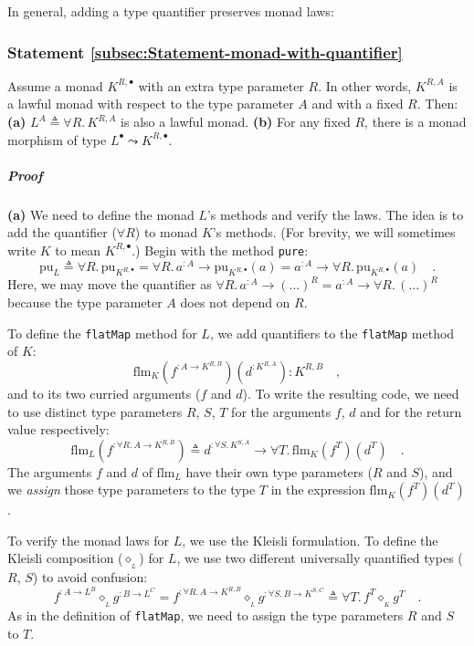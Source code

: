 In general, adding a type quantifier preserves monad laws:

\subsubsection{Statement \label{subsec:Statement-monad-with-quantifier}\ref{subsec:Statement-monad-with-quantifier}}

Assume a monad $K^{R,\bullet}$ with an extra type parameter $R$.
In other words, $K^{R,A}$ is a lawful monad with respect to the type
parameter $A$ and with a fixed $R$. Then: \textbf{(a)} $L^{A}\triangleq\forall R.\,K^{R,A}$
is also a lawful monad. \textbf{(b)} For any fixed $R$, there is
a monad morphism of type $L^{\bullet}\leadsto K^{R,\bullet}$.

\subparagraph{Proof}

\textbf{(a)} We need to define the monad $L$\textsf{'}s methods and verify
the laws. The idea is to add the quantifier ($\forall R$) to monad
$K$\textsf{'}s methods. (For brevity, we will sometimes write $K$ to mean
$K^{R,\bullet}$.) Begin with the method \lstinline!pure!:
\[
\text{pu}_{L}\triangleq\forall R.\,\text{pu}_{K^{R,\bullet}}=\forall R.\,a^{:A}\rightarrow\text{pu}_{K^{R,\bullet}}(a)=a^{:A}\rightarrow\forall R.\,\text{pu}_{K^{R,\bullet}}(a)\quad.
\]
Here, we may move the quantifier as $\forall R.\,a^{:A}\rightarrow(...)^{R}=a^{:A}\rightarrow\forall R.\,(...)^{R}$
because the type parameter $A$ does not depend on $R$.

To define the \lstinline!flatMap! method for $L$, we add quantifiers
to the \lstinline!flatMap! method of $K$:
\[
\text{flm}_{K}(f^{:A\rightarrow K^{R,B}})(d^{:K^{R,A}}):K^{R,B}\quad,
\]
and to its two curried arguments ($f$ and $d$). To write the resulting
code, we need to use distinct type parameters $R$, $S$, $T$ for
the arguments $f$, $d$ and for the return value respectively: 
\[
\text{flm}_{L}(f^{:\forall R.\,A\rightarrow K^{R,B}})\triangleq d^{:\forall S.\,K^{S,A}}\rightarrow\forall T.\,\text{flm}_{K}(f^{T})(d^{T})\quad.
\]
The arguments $f$ and $d$ of $\text{flm}_{L}$ have their own type
parameters ($R$ and $S$), and we \emph{assign} those type parameters
to the type $T$ in the expression $\text{flm}_{K}(f^{T})(d^{T})$.

To verify the monad laws for $L$, we use the Kleisli formulation.
To define the Kleisli composition ($\diamond_{_{L}}$) for $L$, we
use two different universally quantified types ($R$, $S$) to avoid
confusion:
\[
f^{:A\rightarrow L^{B}}\diamond_{_{L}}g^{:B\rightarrow L^{C}}=f^{:\forall R.\,A\rightarrow K^{R,B}}\diamond_{_{L}}g^{:\forall S.\,B\rightarrow K^{S,C}}\triangleq\forall T.\,f^{T}\diamond_{_{K}}g^{T}\quad.
\]
As in the definition of \lstinline!flatMap!, we need to assign the
type parameters $R$ and $S$ to $T$. 

